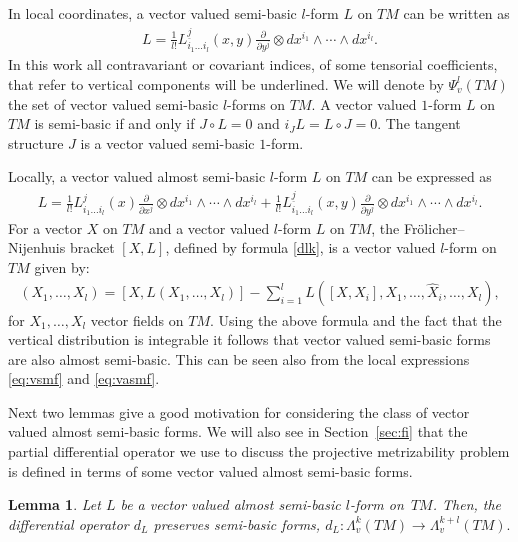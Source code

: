 \documentclass[pdftex]{sigma}
\numberwithin{equation}{section}
\newtheorem{Lemma}[Theorem]{Lemma}
\begin{document}
In local coordinates, a vector valued semi-basic $l$-form $L$ on
$TM$ can be written as
\begin{gather}
L=\frac{1}{l!}L^{\underline{j}}_{i_1\dots i_l}(x,y)\frac{\partial}{\partial y^j}\otimes dx^{i_1}\wedge \cdots
\wedge dx^{i_l}.\label{eq:vsmf}
\end{gather} In this work all contravariant or covariant
indices, of some tensorial coef\/f\/icients, that refer to vertical components will be underlined. We
will denote by $\Psi^l_v(TM)$ the set of vector valued semi-basic
$l$-forms on $TM$. A vector valued $1$-form $L$ on $TM$ is
semi-basic if and only if $J\circ L=0$ and $i_JL=L \circ J=0$. The
tangent structure $J$ is a vector valued semi-basic $1$-form.

Locally, a vector valued almost semi-basic $l$-form $L$ on $TM$ can be
expressed as
\begin{gather}
 L =\frac{1}{l!}L^{j}_{i_1\dots i_l}(x)\frac{\partial}{\partial
x^j}\otimes dx^{i_1}\wedge \cdots \wedge dx^{i_l}  +
\frac{1}{l!}L^{\underline{j}}_{i_1\dots i_l}(x,y)\frac{\partial}{\partial
y^j}\otimes dx^{i_1}\wedge \cdots \wedge
dx^{i_l}.\label{eq:vasmf}
\end{gather}
For a vector $X$ on $TM$ and a vector valued $l$-form $L$
on $TM$, the Fr\"olicher--Nijenhuis bracket $[X,L]$, def\/ined by formula
\eqref{dlk}, is a vector valued $l$-form on $TM$ given by:
\begin{gather*}
[X,L](X_1,\dots ,X_l)=[X,L(X_1,\dots ,X_l)] - \sum_{i=1}^lL([X,X_i],
X_1,\dots ,\hat{X}_i,\dots ,X_l),  %
\end{gather*}
for $X_1, \dots , X_l$ vector f\/ields on $TM$. Using the above formula and the fact that the vertical distribution is integrable it
follows that vector valued semi-basic forms are also almost
semi-basic. This can be seen also from the local expressions
\eqref{eq:vsmf} and \eqref{eq:vasmf}.

Next two lemmas give a good motivation for considering the class of vector
valued almost semi-basic forms. We will also see in Section~\ref{sec:fi} that the partial
dif\/ferential operator we use to discuss the projective metrizability
problem is def\/ined in terms of some vector valued almost
semi-basic forms.

\begin{Lemma} \label{lem:dlomega} Let $L$ be a vector valued almost semi-basic $l$-form on~$TM$.
Then, the differential operator $d_L$ preserves semi-basic forms,
$d_L: \Lambda^k_v(TM) \to \Lambda^{k+l}_v(TM).$
\end{Lemma}
\end{document}
